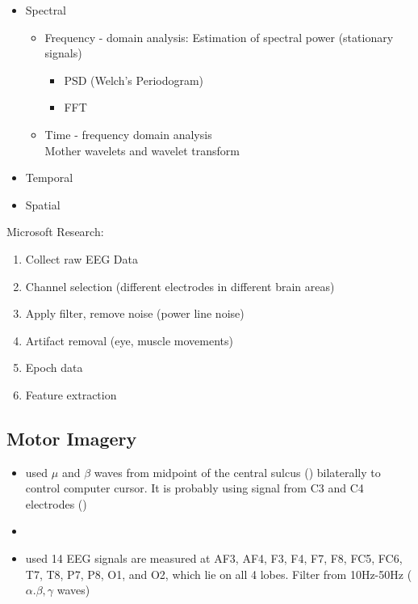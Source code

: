 \begin{itemize}
	\item Spectral
	\begin{itemize}
		\item Frequency - domain analysis: Estimation of spectral power (stationary signals)
		\begin{itemize}
			\item \ac{PSD} (Welch's Periodogram)
			\item \ac{FFT}
		\end{itemize}		
		\item Time - frequency domain analysis\\
		Mother wavelets and wavelet transform
	\end{itemize}	
	\item Temporal
	\item Spatial
\end{itemize}

Microsoft Research:
\begin{enumerate}
	\item Collect raw EEG Data
	\item Channel selection (different electrodes in different brain areas)
	\item Apply filter, remove noise (power line noise)
	\item Artifact removal (eye, muscle movements)
	\item Epoch data
	\item Feature extraction
\end{enumerate}

\subsection{Motor Imagery}
\begin{itemize}
	\item {} used $\mu$ and $\beta$ waves from midpoint of the central sulcus () bilaterally to control computer cursor. It is probably using signal from C3 and C4 electrodes ()
	\item {}
	\item {} used 14 EEG signals are measured at AF3, AF4, F3, F4, F7, F8, FC5, FC6, T7, T8, P7, P8, O1, and O2, which lie on all 4 lobes. Filter from 10Hz-50Hz ($\alpha. \beta, \gamma$ waves)
\end{itemize}

